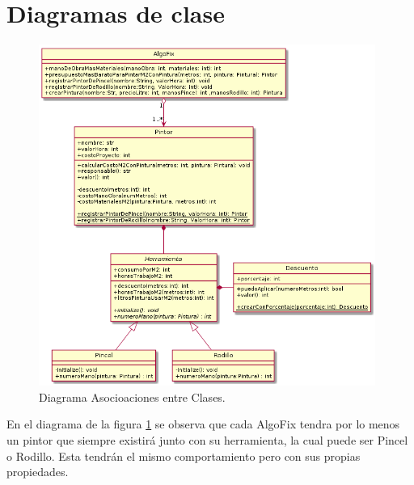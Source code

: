 \documentclass[titlepage,a4paper]{article}
\begin{document}
\section{Diagramas de clase}\label{sec:diagramasdeclase}



\begin{figure}[H]
  \centering
  \includegraphics[width=0.98\textwidth]{diagrama_clase01.png}
  \caption{\label{fig:class01}Diagrama Asocioaciones entre Clases.}
  \end{figure}

  En el diagrama de la figura \ref{fig:class01} se observa que cada AlgoFix tendra por lo menos un pintor que siempre existirá 
  junto con su herramienta, la cual puede ser Pincel o Rodillo. 
  Esta tendrán el mismo comportamiento pero con sus propias propiedades. 
  
\end{document}
